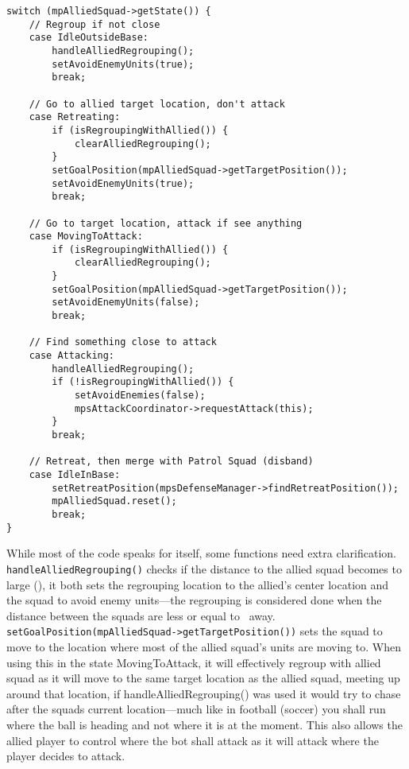\begin{lstlisting}[caption={Squad actions depending on the allied squad's state.},label={lst:attack_follow_allied}]
switch (mpAlliedSquad->getState()) {
	// Regroup if not close
	case IdleOutsideBase:
		handleAlliedRegrouping();
		setAvoidEnemyUnits(true);
		break;
	
	// Go to allied target location, don't attack
	case Retreating:
		if (isRegroupingWithAllied()) {
			clearAlliedRegrouping();
		}
		setGoalPosition(mpAlliedSquad->getTargetPosition());
		setAvoidEnemyUnits(true);
		break;

	// Go to target location, attack if see anything
	case MovingToAttack: 
		if (isRegroupingWithAllied()) {
			clearAlliedRegrouping();
		}
		setGoalPosition(mpAlliedSquad->getTargetPosition());
		setAvoidEnemyUnits(false);
		break;

	// Find something close to attack
	case Attacking:
		handleAlliedRegrouping();
		if (!isRegroupingWithAllied()) {
			setAvoidEnemies(false);
			mpsAttackCoordinator->requestAttack(this);
		}
		break;

	// Retreat, then merge with Patrol Squad (disband)
	case IdleInBase:
		setRetreatPosition(mpsDefenseManager->findRetreatPosition());
		mpAlliedSquad.reset();
		break;
}
\end{lstlisting}
While most of the code speaks for itself, some functions need extra clarification. \texttt{handleAlliedRegrouping()} checks if the distance to the allied squad becomes to large (\squadAttackAlliedRegroupBegin), it both sets the regrouping location to the allied's center location and the squad to avoid enemy units—the regrouping is considered done when the distance between the squads are less or equal to \squadAttackAlliedRegroupEnd~away. \texttt{setGoalPosition(mpAlliedSquad->getTargetPosition())} sets the squad to move to the location where most of the allied squad's units are moving to. When using this in the state MovingToAttack, it will effectively regroup with allied squad as it will move to the same target location as the allied squad, meeting up around that location, if handleAlliedRegrouping() was used it would try to chase after the squads current location—much like in football (soccer) you shall run where the ball is heading and not where it is at the moment. This also allows the allied player to control where the bot shall attack as it will attack where the player decides to attack.

